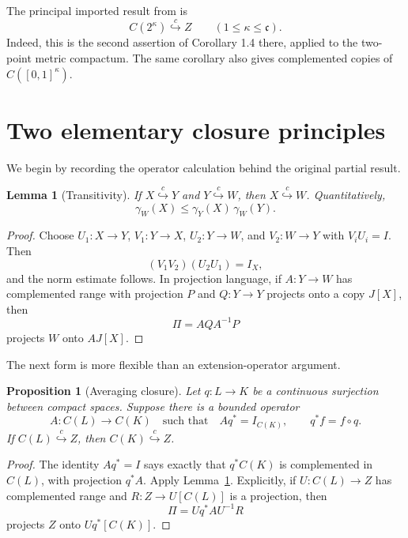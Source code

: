 \documentclass[11pt]{article}
\newtheorem{proposition}[theorem]{Proposition}
\newtheorem{lemma}[theorem]{Lemma}
\theoremstyle{definition}
\theoremstyle{remark}
\newcommand{\C}{C}
\newcommand{\cc}{\mathfrak c}
\newcommand{\Id}{I}
\newcommand{\hookc}{\stackrel{c}{\hookrightarrow}}
\begin{document}
The principal imported result from \cite{PRS26} is
\begin{equation}\label{eq:cube-in-Z}
 \C(2^\kappa)\hookc Z
 \qquad (1\leq \kappa\leq\cc).
\end{equation}
Indeed, this is the second assertion of Corollary 1.4 there, applied to the
two-point metric compactum.  The same corollary also gives complemented
copies of $\C([0,1]^\kappa)$.

\section{Two elementary closure principles}

We begin by recording the operator calculation behind the original partial
result.

\begin{lemma}[Transitivity]\label{lem:transitivity}
If $X\hookc Y$ and $Y\hookc W$, then $X\hookc W$.  Quantitatively,
\[
       \gamma_W(X)\leq \gamma_Y(X)\,\gamma_W(Y).
\]
\end{lemma}

\begin{proof}
Choose $U_1:X\to Y$, $V_1:Y\to X$, $U_2:Y\to W$, and $V_2:W\to Y$
with $V_iU_i=\Id$.  Then
\[
       (V_1V_2)(U_2U_1)=\Id_X,
\]
and the norm estimate follows.  In projection language, if $A:Y\to W$ has
complemented range with projection $P$ and $Q:Y\to Y$ projects onto a copy
$J[X]$, then
\[
       \Pi=AQA^{-1}P
\]
projects $W$ onto $AJ[X]$.
\end{proof}

The next form is more flexible than an extension-operator argument.

\begin{proposition}[Averaging closure]\label{prop:averaging-closure}
Let $q:L\to K$ be a continuous surjection between compact spaces.  Suppose
there is a bounded operator
\[
       A:\C(L)\longrightarrow\C(K)
       \quad\text{such that}\quad A q^*=\Id_{\C(K)},
       \qquad q^*f=f\circ q.
\]
If $\C(L)\hookc Z$, then $\C(K)\hookc Z$.
\end{proposition}

\begin{proof}
The identity $Aq^*=\Id$ says exactly that $q^*\C(K)$ is complemented in
$\C(L)$, with projection $q^*A$.  Apply Lemma~\ref{lem:transitivity}.
Explicitly, if $U:\C(L)\to Z$ has complemented range and $R:Z\to U[\C(L)]$
is a projection, then
\[
       \Pi=Uq^*AU^{-1}R
\]
projects $Z$ onto $Uq^*[\C(K)]$.
\end{proof}
\end{document}
